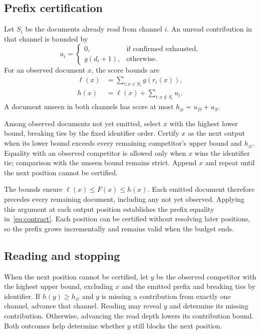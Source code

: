 \subsection{Prefix certification}

\label{prefix-certification}

Let \(S_i\) be the documents already read from channel \(i\). An unread contribution in that channel is bounded by \begin{equation}
u_i=\begin{cases}
 0,&\text{if confirmed exhausted},\\
 g(d_i+1),&\text{otherwise}.
 \end{cases}
\label{eq:unread}
\end{equation} For an observed document \(x\), the score bounds are \begin{align}
\ell(x)&=\sum_{i:x\in S_i}g(r_i(x)),\label{eq:lower}\\
h(x)&=\ell(x)+\sum_{i:x\notin S_i}u_i.\label{eq:upper}
\end{align} A document unseen in both channels has score at most \(h_{\varnothing}=u_D+u_S\).

Among observed documents not yet emitted, select \(x\) with the highest lower bound, breaking ties by the fixed identifier order. Certify \(x\) as the next output when its lower bound exceeds every remaining competitor's upper bound and \(h_{\varnothing}\). Equality with an observed competitor is allowed only when \(x\) wins the identifier tie; comparison with the unseen bound remains strict. Append \(x\) and repeat until the next position cannot be certified.

The bounds ensure \(\ell(x)\leq F(x)\leq h(x)\). Each emitted document therefore precedes every remaining document, including any not yet observed. Applying this argument at each output position establishes the prefix equality in~\eqref{eq:contract}. Each position can be certified without resolving later positions, so the prefix grows incrementally and remains valid when the budget ends.

\subsection{Reading and stopping}

\label{reading-and-stopping}

When the next position cannot be certified, let \(y\) be the observed competitor with the highest upper bound, excluding \(x\) and the emitted prefix and breaking ties by identifier. If \(h(y)\geq h_{\varnothing}\) and \(y\) is missing a contribution from exactly one channel, advance that channel. Reading may reveal \(y\) and determine its missing contribution. Otherwise, advancing the read depth lowers its contribution bound. Both outcomes help determine whether \(y\) still blocks the next position.

